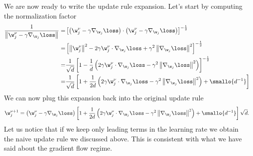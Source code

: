 We are now ready to write the update rule expansion.
 Let's start by computing the normalization factor
\[\begin{split}
  \frac{1}{\left\|\w^{\nu}_j - \gamma \nabla_{\w_j}{\loss}\right\|} =&
    \left[\left(\w^{\nu}_j - \gamma \nabla_{\w_j}{\loss}\right)\cdot\left(\w^{\nu}_j - \gamma \nabla_{\w_j}{\loss}\right)\right]^{-\frac12} \\
    =&\left[\left\|\w^{\nu}_j\right\|^2 - 2\gamma\w^{\nu}_j\cdot \nabla_{\w_j}{\loss}+\gamma^2\left\|\nabla_{\w_j}{\loss}\right\|^2\right]^{-\frac12} \\
    =&\frac{1}{\sqrt{d}}\left[1- \frac1d\left(2\gamma\w^{\nu}_j\cdot \nabla_{\w_j}{\loss}-\gamma^2\left\|\nabla_{\w_j}{\loss}\right\|^2\right)\right]^{-\frac12} \\
    =&\frac{1}{\sqrt{d}}\left[1+ \frac{1}{2d}\left(2\gamma\w^{\nu}_j\cdot \nabla_{\w_j}{\loss}-\gamma^2\left\|\nabla_{\w_j}{\loss}\right\|^2\right)+\smallo{d^{-1}}\right]
\end{split}\]
We can now plug this expansion back into the original update rule
\[
  \w^{\nu+1}_j =\left(\w^{\nu}_j - \gamma \nabla_{\w_j}{\loss}\right)\left[1+ \frac{1}{2d}\left(2\gamma\w^{\nu}_j\cdot \nabla_{\w_j}{\loss}-\gamma^2\left\|\nabla_{\w_j}{\loss}\right\|^2\right)+\smallo{d^{-1}}\right]\sqrt{d}.
\]
Let us notice that if we keep only leading terms in the learning rate we obtain 
the naive update rule we discussed above. 
This is consistent with what we have said about the gradient flow regime. 

